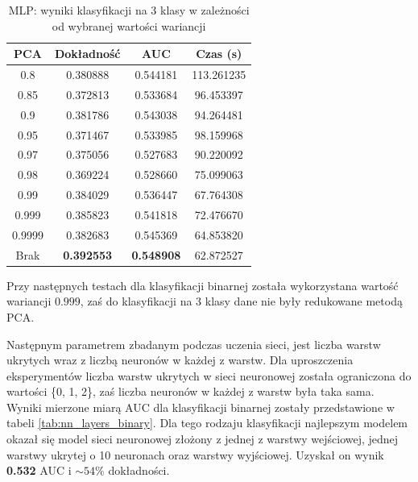\documentclass[a4paper, twoside, 11pt, openright]{article}
\begin{document}
\begin{table}[H]
    \centering
    \begin{tabular}{|c|c|c|c|}
    \hline
        \textbf{PCA} & \textbf{Dokładność} &  \textbf{AUC} &  \textbf{Czas (s)} \\ \hline
0.8                &  0.380888 &  0.544181 &  113.261235 \\ \hline
0.85               &  0.372813 &  0.533684 &   96.453397 \\ \hline
0.9                &  0.381786 &  0.543038 &   94.264481 \\ \hline
0.95               &  0.371467 &  0.533985 &   98.159968 \\ \hline
0.97               &  0.375056 &  0.527683 &   90.220092 \\ \hline
0.98               &  0.369224 &  0.528660 &   75.099063 \\ \hline
0.99               &  0.384029 &  0.536447 &   67.764308 \\ \hline
0.999              &  0.385823 &  0.541818 &   72.476670 \\ \hline
0.9999             &  0.382683 &  0.545369 &   64.853820 \\ \hline
Brak                &  \textbf{0.392553} &  \textbf{0.548908} &   62.872527 \\ \hline
    \end{tabular}
    \caption{MLP: wyniki klasyfikacji na 3 klasy w zależności od wybranej wartości wariancji}
    \label{tab:nn_pca_discrete}
\end{table}

Przy następnych testach dla klasyfikacji binarnej została wykorzystana wartość wariancji $0.999$, zaś do klasyfikacji na 3 klasy dane nie były redukowane metodą PCA.

\bigskip

Następnym parametrem zbadanym podczas uczenia sieci, jest liczba warstw ukrytych wraz z liczbą neuronów w każdej z warstw. Dla uproszczenia eksperymentów liczba warstw ukrytych w sieci neuronowej została ograniczona do wartości \{0, 1, 2\}, zaś liczba neuronów w każdej z warstw była taka sama. Wyniki mierzone miarą AUC dla klasyfikacji binarnej zostały przedstawione w tabeli \ref{tab:nn_layers_binary}. Dla tego rodzaju klasyfikacji najlepszym modelem okazał się model sieci neuronowej złożony z jednej z warstwy wejściowej, jednej warstwy ukrytej o 10 neuronach oraz warstwy wyjściowej. Uzyskał on wynik \textbf{0.532} AUC i $\sim 54\%$ dokładności.
\end{document}
